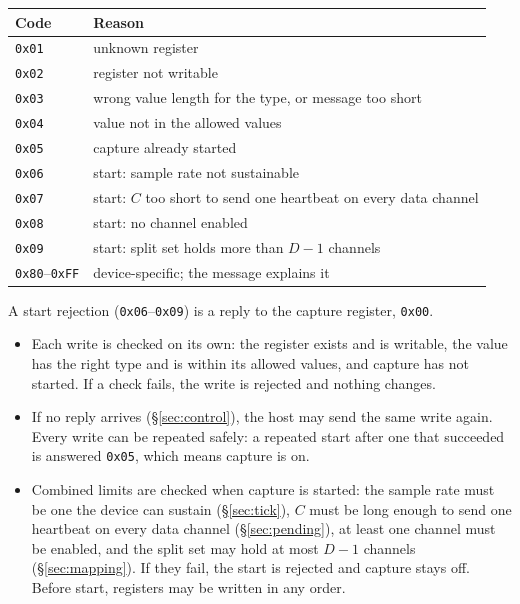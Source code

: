 \documentclass[11pt,a4paper]{article}
\newcommand{\sref}[1]{\S\ref{#1}}
\newcommand{\hex}[1]{\texttt{#1}}
\begin{document}
\medskip

\begin{tabularx}{\linewidth}{@{}l L@{}}
\toprule
\textbf{Code} & \textbf{Reason} \\
\midrule
\hex{0x01} & unknown register \\
\hex{0x02} & register not writable \\
\hex{0x03} & wrong value length for the type, or message too short \\
\hex{0x04} & value not in the allowed values \\
\hex{0x05} & capture already started \\
\hex{0x06} & start: sample rate not sustainable \\
\hex{0x07} & start: $C$ too short to send one heartbeat on every data channel \\
\hex{0x08} & start: no channel enabled \\
\hex{0x09} & start: split set holds more than $D-1$ channels \\
\hex{0x80}--\hex{0xFF} & device-specific; the message explains it \\
\bottomrule
\end{tabularx}

A start rejection (\hex{0x06}--\hex{0x09}) is a reply to the capture register,
\hex{0x00}.

\begin{itemize}
  \item Each write is checked on its own: the register exists and is writable, the
        value has the right type and is within its allowed values, and capture has not
        started. If a check fails, the write is rejected and nothing changes.
  \item If no reply arrives (\sref{sec:control}), the host may send the same write
        again. Every write can be repeated safely: a repeated start after one that
        succeeded is answered \hex{0x05}, which means capture is on.
  \item Combined limits are checked when capture is started: the sample rate must be
        one the device can sustain (\sref{sec:tick}), $C$ must be long enough to send
        one heartbeat on every data channel (\sref{sec:pending}), at least one channel
        must be enabled, and the split set may hold at most $D-1$ channels
        (\sref{sec:mapping}). If they fail, the start is rejected and capture stays
        off. Before start, registers may be written in any order.
\end{itemize}
\end{document}
